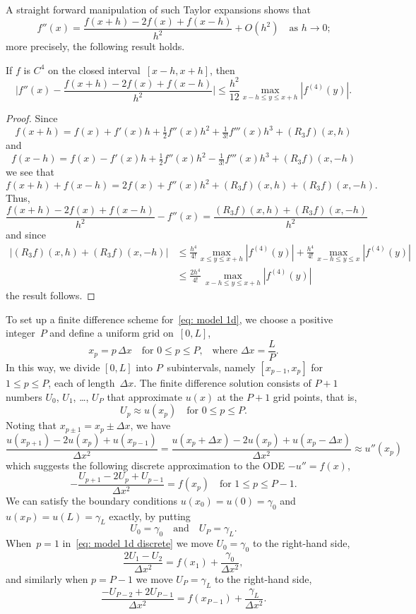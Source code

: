 A straight forward manipulation of such Taylor expansions shows that
\[
f''(x)=\frac{f(x+h)-2f(x)+f(x-h)}{h^2}+O(h^2)\quad\text{as $h\to0$;}
\]
more precisely, the following result holds.

\begin{theorem}\label{thm: 2nd central diff}
If $f$ is $C^4$ on the closed interval~$[x-h,x+h]$, then
\[
\biggl|f''(x)-\frac{f(x+h)-2f(x)+f(x-h)}{h^2}\biggr|\le\frac{h^2}{12}
	\max_{x-h\le y\le x+h}|f^{(4)}(y)|.
\]
\end{theorem}
\begin{proof}
Since
\[
f(x+h)=f(x)+f'(x)h+\tfrac12f''(x)h^2+\tfrac{1}{3!}f'''(x)h^3+(R_3f)(x,h)
\]
and
\[
f(x-h)=f(x)-f'(x)h+\tfrac12f''(x)h^2-\tfrac{1}{3!}f'''(x)h^3+(R_3f)(x,-h)
\]
we see that
\[
f(x+h)+f(x-h)=2f(x)+f''(x)h^2+(R_3f)(x,h)+(R_3f)(x,-h).
\]
Thus,
\begin{equation}\label{eq: second diff remainder}
\frac{f(x+h)-2f(x)+f(x-h)}{h^2}-f''(x)=\frac{(R_3f)(x,h)+(R_3f)(x,-h)}{h^2}
\end{equation}
and since
\begin{align*}
|(R_3f)(x,h)+(R_3f)(x,-h)|&\le
\frac{h^4}{4!}\max_{x\le y\le x+h}|f^{(4)}(y)|
+\frac{h^4}{4!}\max_{x-h\le y\le x}|f^{(4)}(y)|\\
	&\le\frac{2h^4}{4!}\,\max_{x-h\le y\le x+h}|f^{(4)}(y)|
\end{align*}
the result follows.
\end{proof}

To set up a finite difference scheme for~\eqref{eq: model 1d}, we choose a 
positive integer~$P$ and define a uniform grid on~$[0,L]$,
\[
x_p=p\,\Delta x\quad\text{for $0\le p\le P$,}
	\quad\text{where $\Delta x=\frac{L}{P}$.}
\]
In this way, we divide $[0,L]$ into $P$~subintervals, namely $[x_{p-1},x_p]$
for~$1\le p\le P$, each of length~$\Delta x$.  The finite difference solution 
consists of $P+1$ numbers $U_0$, $U_1$, \dots, $U_P$ that approximate $u(x)$ at 
the $P+1$ grid points, that is,
\[
U_p\approx u(x_p)\quad\text{for $0\le p\le P$.}
\]
Noting that $x_{p\pm1}=x_p\pm\Delta x$, we have
\begin{equation}\label{eq: u'' approx}
\frac{u(x_{p+1})-2u(x_p)+u(x_{p-1})}{\Delta x^2}
	=\frac{u(x_p+\Delta x)-2u(x_p)+u(x_p-\Delta x)}{\Delta x^2}
	\approx u''(x_p)
\end{equation}
which suggests the following discrete approximation to the ODE $-u''=f(x)$,
\begin{equation}\label{eq: model 1d discrete}
-\frac{U_{p+1}-2U_p+U_{p-1}}{\Delta x^2}=f(x_p)\quad\text{for $1\le p\le P-1$.}
\end{equation}
We can satisfy the boundary conditions $u(x_0)=u(0)=\gamma_0$ and 
$u(x_P)=u(L)=\gamma_L$ exactly, by putting
\[
U_0=\gamma_0\quad\text{and}\quad U_P=\gamma_L.
\]
When~$p=1$ in~\eqref{eq: model 1d discrete} we move $U_0=\gamma_0$ to the 
right-hand side, 
\[
\frac{2U_1-U_2}{\Delta x^2}=f(x_1)+\frac{\gamma_0}{\Delta x^2},
\]
and similarly when $p=P-1$ we move $U_P=\gamma_L$ to the right-hand side,
\[
\frac{-U_{P-2}+2U_{P-1}}{\Delta x^2}=f(x_{P-1})+\frac{\gamma_L}{\Delta x^2}.
\]

